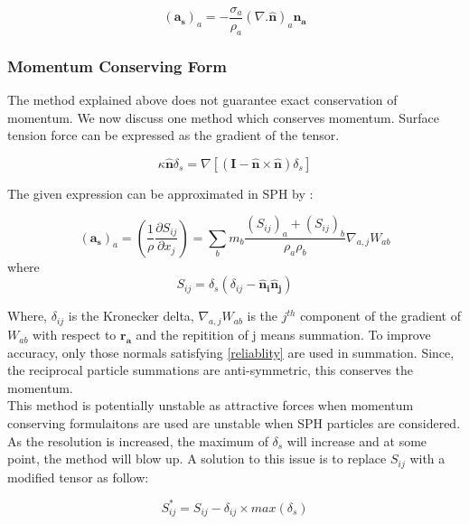 \begin{equation}
 (\mathbf{a_s})_a = -\frac{\sigma_a}{\rho_a}(\nabla.\mathbf{\hat n})_a \mathbf{n_a}
\end{equation}


\subsubsection{Momentum Conserving Form}
The method explained above does not guarantee exact conservation of momentum. We now discuss one method which conserves momentum. Surface tension force can be expressed as the gradient of the tensor. \cite{Surface}

\begin{equation}
 \kappa \mathbf{\hat n} \delta_s = \nabla[(\mathbf{I} - \mathbf{\hat n}\times\mathbf{\hat n})\delta_s]
\end{equation}

\noindent
The given expression can be approximated in SPH by \cite{Morris}:

\begin{equation}
 (\mathbf{a_s})_a = \left( \frac{1}{\rho} \frac{\partial S_{ij}}{\partial x_j} \right) = \sum_b m_b \frac{(S_{ij})_a + (S_{ij})_b}{\rho_a \rho_b} \nabla_{a, j} W_{ab}
\end{equation}
\noindent
where 
\begin{equation}
 S_{ij} = \delta_s(\delta_{ij} - \mathbf{\hat n_i}\mathbf{\hat n_j})
\end{equation}

\noindent
Where, $\delta_{ij}$ is the Kronecker delta, $\nabla_{a,j}W_{ab}$ is the $j^{th}$ component of the gradient of $W_{ab}$ with respect to $\mathbf{r_a}$ and the repitition of j means summation. To improve accuracy, only those normals satisfying \ref{reliablity} are used in summation. Since, the reciprocal particle summations are anti-symmetric, this conserves the momentum.\\

This method is potentially unstable as attractive forces when momentum conserving formulaitons are used are unstable when SPH particles are considered.\\
As the resolution is increased, the maximum of $\delta_s$ will increase and at some point, the method will blow up. A solution to this issue is to replace $S_{ij}$ with a modified tensor as follow:

\begin{equation}
 S_{ij}^* = S_{ij} - \delta_{ij}\times max(\delta_s)
\end{equation}


